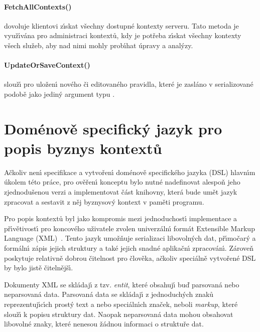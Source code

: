 \paragraph{FetchAllContexts()} dovoluje klientovi z\'{\i}skat všechny
dostupné kontexty serveru. Tato metoda je využ\'{\i}vána pro administraci
kontextů, kdy je potřeba z\'{\i}skat všechny kontexty všech služeb, aby
nad nimi mohly prob\'{\i}hat úpravy a anal\'yzy.

\paragraph{UpdateOrSaveContext()} slouž\'{\i} pro uložen\'{\i} nového či
editovaného pravidla, které je zasláno v serializované podobě
jako jedin\'y argument typu .

\section{Doménově specifick\'y jazyk pro popis byznys kontextů}\label{sec:dsl-impl}

Ačkoliv nen\'{\i} specifikace a vytvořen\'{\i} doménově specifického jazyka (\gls{DSL})
hlavn\'{\i}m úkolem této práce, pro ověřen\'{\i} konceptu bylo nutné nadefinovat
alespoň jeho zjednodušenou verzi a implementovat část knihovny, která
bude umět jazyk zpracovat a sestavit z něj byznysov\'y kontext v paměti programu.

Pro popis kontextů byl jako kompromis mezi jednoduchost\'{\i} implementace
a př\'{\i}větivost\'{\i} pro koncového uživatele zvolen univerzáln\'{\i} formát Extensible
Markup Language (\gls{XML})~\cite{bray1997extensible}. Tento
jazyk umožňuje serializaci libovoln\'ych dat, př\'{\i}močar\'y a formáln\'{\i}
zápis jejich struktury a také jejich snadné aplikačn\'{\i} zpracován\'{\i}.
Zároveň poskytuje relativně dobrou čitelnost pro člověka, ačkoliv
speciálně vytvořené \gls{DSL} by bylo jistě čitelnějš\'{\i}.

Dokumenty \gls{XML} se skládaj\'{\i} z tzv. \textit{entit}, které obsahuj\'{\i}
buď parsovaná nebo neparsovaná data. Parsovaná data se skládaj\'{\i}
z jednoduch\'ych znaků reprezentuj\'{\i}c\'{\i}ch prost\'y text a nebo
speciáln\'{\i}ch značek, neboli \textit{markup}, které slouž\'{\i} k popisu
struktury dat. Naopak neparsovaná data mohou obsahovat libovolné
znaky, které nenesou žádnou informaci o struktuře dat.

